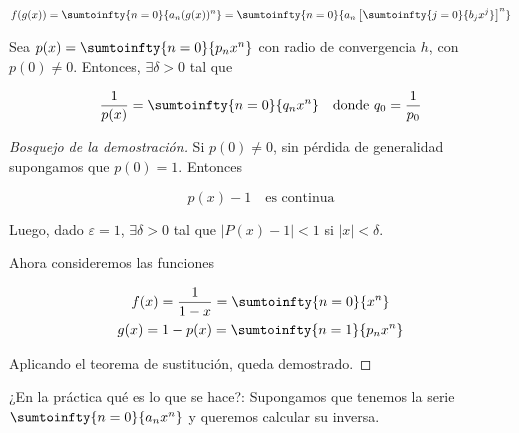 \[
f(g(x)) = \sumtoinfty{n=0}{a_n(g(x))^n} = \sumtoinfty{n=0}{a_n\left[ \sumtoinfty{j=0}{b_jx^j} \right]^n}
\]

\begin{teo}
    Sea $p(x) = \sumtoinfty{n=0}{p_nx^n}$ con radio de convergencia $h$, con $p(0) \neq 0$. Entonces, $\exists \delta > 0$ tal que
    
    \[
    \frac{1}{p(x)} = \sumtoinfty{n=0}{q_nx^n} \quad \text{donde $\displaystyle q_0 = \frac{1}{p_0}$}
    \]
\end{teo}

\begin{proof}[Bosquejo de la demostración]
    Si $p(0) \neq 0$, sin pérdida de generalidad supongamos que $p(0) = 1$. Entonces
    
    \[
    p(x) - 1 \quad \text{es continua}
    \]
    
    Luego, dado $\varepsilon = 1$, $\exists \delta > 0$ tal que $|P(x) - 1| < 1$ si $|x| < \delta$.
    
    Ahora consideremos las funciones
    
    \begin{gather*}
        f(x) = \frac{1}{1-x} = \sumtoinfty{n=0}{x^n} \\
        g(x) = 1 - p(x) = \sumtoinfty{n=1}{p_nx^n}
    \end{gather*}
    
    Aplicando el teorema de sustitución, queda demostrado.
\end{proof}

\begin{pre}
    ¿En la práctica qué es lo que se hace?: Supongamos que tenemos la serie $\sumtoinfty{n=0}{a_nx^n}$ y queremos calcular su inversa.
\end{pre}

